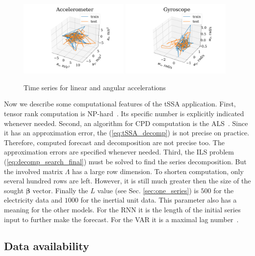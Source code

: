 \documentclass[referee, pdflatex, sn-mathphys-num]{sn-jnl}
\theoremstyle{definition}
\theoremstyle{plain}
\begin{document}
	\begin{figure}[h]
		\centering
		\includegraphics[width=0.48\textwidth, keepaspectratio]{acceleromter_example.png}
		\includegraphics[width=0.48\textwidth, keepaspectratio]{gyro_example.png}
		\caption{Time series for linear and angular accelerations}\label{fig:motion_data}
	\end{figure}
	
	Now we describe some computational features of the tSSA application. First, tensor rank computation is NP-hard~\cite{HASTAD1990644}. Its specific number is explicitly indicated whenever needed. Second, an algorithm for CPD computation is the ALS~\cite{kolda_tensors}. Since it has an approximation error, the (\ref{eq:tSSA_decomp}) is not precise on practice. Therefore, computed forecast and decomposition are not precise too. The approximation errors are specified whenever needed. Third, the ILS problem (\ref{eq:decomp_search_final}) must be solved to find the series decomposition. But the involved matrix $ \Lambda $ has a large row dimension. To shorten computation, only several hundred rows are left. However, it is still much greater then the size of the sought $ \boldsymbol{\beta} $ vector.	Finally the $ L $ value (see Sec. \ref{sec:one_series}) is $ 500 $ for the electricity data and $ 1000 $ for the inertial unit data. This parameter also has a meaning for the other models. For the RNN it is the length of the initial series input to further make the forecast. For the VAR it is a maximal lag number~\cite{3b1355aedd1041f1853e609a410576f3}. 
	
	\subsection{Data availability}
	
\end{document}
